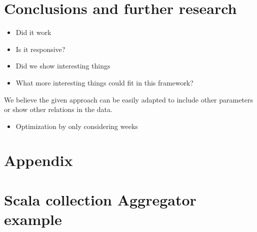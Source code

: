 \documentclass[10pt,a4paper]{article}
\renewcommand\appendix{\par
\setcounter{section}{0}%
\setcounter{subsection}{0}%
\setcounter{table}{0}
\setcounter{figure}{0}
\setcounter{equation}{0}
\gdef\thetable{\Alph{table}}
\gdef\thefigure{\Alph{figure}}
\gdef\theequation{\Alph{section}-\arabic{equation}}
\section*{Appendix}
\gdef\thesection{\Alph{section}}
\setcounter{section}{0}}
\begin{document}
\section{Conclusions and further research}\label{sec:conclusions}

\begin{itemize}
    \item Did it work
    \item Is it responsive?
    \item Did we show interesting things
    \item What more interesting things could fit in this framework?
\end{itemize}

We believe the given approach can be easily adapted to include other parameters or show other relations in the data.

\begin{itemize}
    \item Optimization by only considering weeks
\end{itemize}




\appendix

\section{Scala collection Aggregator example}
\end{document}

